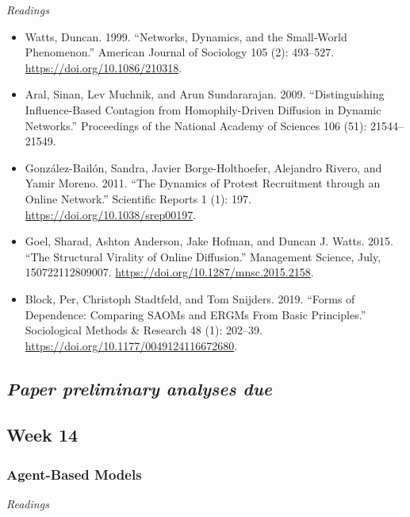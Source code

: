 \documentclass[
  10pt,
]{article}
\providecommand{\tightlist}{%
  \setlength{\itemsep}{0pt}\setlength{\parskip}{0pt}}
\begin{document}
\emph{Readings}

\begin{itemize}
\tightlist
\item
  Watts, Duncan. 1999. ``Networks, Dynamics, and the Small‐World
  Phenomenon.'' American Journal of Sociology 105 (2): 493--527.
  \url{https://doi.org/10.1086/210318}.
\item
  Aral, Sinan, Lev Muchnik, and Arun Sundararajan. 2009.
  ``Distinguishing Influence-Based Contagion from Homophily-Driven
  Diffusion in Dynamic Networks.'' Proceedings of the National Academy
  of Sciences 106 (51): 21544--21549.
\item
  González-Bailón, Sandra, Javier Borge-Holthoefer, Alejandro Rivero,
  and Yamir Moreno. 2011. ``The Dynamics of Protest Recruitment through
  an Online Network.'' Scientific Reports 1 (1): 197.
  \url{https://doi.org/10.1038/srep00197}.
\item
  Goel, Sharad, Ashton Anderson, Jake Hofman, and Duncan J. Watts. 2015.
  ``The Structural Virality of Online Diffusion.'' Management Science,
  July, 150722112809007. \url{https://doi.org/10.1287/mnsc.2015.2158}.
\item
  Block, Per, Christoph Stadtfeld, and Tom Snijders. 2019. ``Forms of
  Dependence: Comparing SAOMs and ERGMs From Basic Principles.''
  Sociological Methods \& Research 48 (1): 202--39.
  \url{https://doi.org/10.1177/0049124116672680}.
\end{itemize}

\hypertarget{paper-preliminary-analyses-due}{%
\subsection{\texorpdfstring{\emph{Paper preliminary analyses
due}}{Paper preliminary analyses due}}\label{paper-preliminary-analyses-due}}

\hypertarget{week-14}{%
\subsection{Week 14}\label{week-14}}

\hypertarget{agent-based-models}{%
\subsubsection{Agent-Based Models}\label{agent-based-models}}

\emph{Readings}
\end{document}
